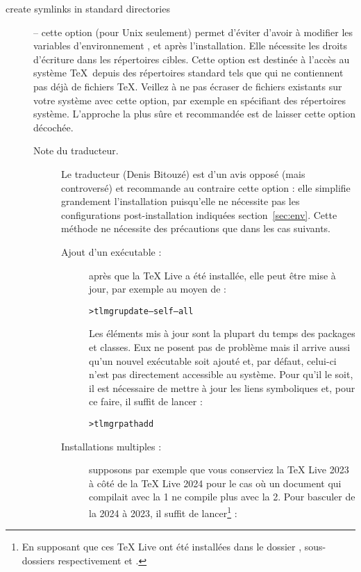\documentclass[german, english, french, 12pt]{article}
\renewcommand{\TL}{\TeX{} Live\xspace}%
\begin{document}
\begin{description}
\item[create symlinks in standard directories] -- cette option (pour Unix
  seulement) permet d'éviter d'avoir à modifier les variables d'environnement
  ,  et  après
  l'installation. Elle nécessite les droits d'écriture dans les répertoires
  cibles. Cette option est destinée à l'accès au système \TeX\ depuis des
  répertoires standard tels que  qui ne contiennent pas
  déjà de fichiers \TeX. Veillez à ne pas écraser de fichiers existants sur
  votre système avec cette option, par exemple en spécifiant des répertoires
  système. L'approche la plus sûre et recommandée est de laisser cette option
  décochée.
  \begin{description}
  \item[Note du traducteur.] Le traducteur (Denis Bitouzé) est d'un avis
    opposé (mais controversé) et recommande au contraire cette option : elle
    simplifie grandement l'installation puisqu'elle ne nécessite pas les
    configurations post-installation indiquées section~\ref{sec:env}. Cette
    méthode ne nécessite des précautions que dans les cas suivants.
    \begin{description}
    \item[Ajout d'un exécutable :] après que la \TL{} a été installée, elle peut
      être mise à jour, par exemple au moyen de :
\begin{alltt}
> tlmgr update --self --all
\end{alltt}
      Les éléments mis à jour sont la plupart du temps des packages et
      classes. Eux ne posent pas de problème mais il arrive aussi qu'un nouvel
      exécutable soit ajouté et, par défaut, celui-ci n'est pas directement
      accessible au système. Pour qu'il le soit, il est nécessaire de mettre
      à jour les liens symboliques et, pour ce faire, il suffit de lancer :
\begin{alltt}
> tlmgr path add
\end{alltt}
    \item[Installations multiples :] supposons par exemple que vous conserviez
      la \TL{} 2023 à côté de la \TL{} 2024 pour le cas où un document qui
      compilait avec la 1\iere{} ne compile plus avec la 2\ieme{}. Pour basculer
      de la 2024 à 2023, il suffit de lancer\footnote{En supposant que
        ces \TL{} ont été installées dans le dossier
        , sous-dossiers respectivement
         et .} :
\begin{alltt}

\end{alltt}
\end{description}
\end{description}
\end{description}
\end{document}
